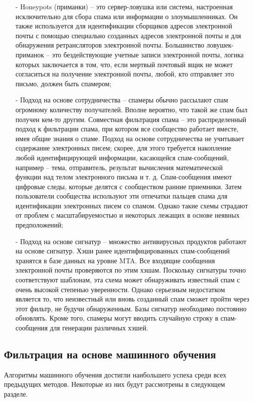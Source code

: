     \begin{itemize}
        \item[-] Honeypots (приманки) -- это сервер-ловушка или система, настроенная исключительно для сбора спама или 
        информации о злоумышленниках. Он также используется для идентификации сборщиков адресов электронной 
        почты с помощью специально созданных адресов электронной почты и для обнаружения ретрансляторов 
        электронной почты. Большинство ловушек-приманок -- это бездействующие учетные записи электронной почты, 
        логика которых заключается в том, что, если мертвый почтовый ящик не может согласиться на получение 
        электронной почты, любой, кто отправляет это письмо, должен быть спамером;
        \item[-] Подход на основе сотрудничества -- спамеры обычно рассылают спам огромному количеству получателей. Вполне вероятно, что такой же спам 
        был получен кем-то другим. Совместная фильтрация спама -- это распределенный подход к фильтрации спама, 
        при котором все сообщество работает вместе, имея общие знания о спаме. Подход на основе сотрудничества 
        не учитывает содержание электронных писем; скорее, для этого требуется накопление любой идентифицирующей 
        информации, касающейся спам-сообщений, например -- тема, отправитель, результат вычисления математической 
        функции над телом электронного письма и т. д. Спам-сообщения имеют цифровые следы, которые делятся с 
        сообществом ранние приемники. Затем пользователи сообщества используют эти отпечатки пальцев спама для 
        идентификации электронных писем со спамом. Однако такие схемы страдают от проблем с 
        масштабируемостью и некоторых лежащих в основе неявных предположений;
        \item[-] Подход на основе сигнатур -- множество антивирусных продуктов работают на основе сигнатур. Хэши ранее 
        идентифицированных спам-сообщений хранятся в базе данных на уровне MTA. Все входящие сообщения 
        электронной почты проверяются по этим хэшам. Поскольку сигнатуры точно соответствуют шаблонам, 
        эта схема может обнаруживать известный спам с очень высокой степенью уверенности. 
        Однако серьезным недостатком является то, что неизвестный или вновь созданный спам сможет 
        пройти через этот фильтр, не будучи обнаруженным. Базы сигнатур необходимо постоянно обновлять. 
        Кроме того, спамеры могут вводить случайную строку в спам-сообщения для генерации различных хэшей.
    \end{itemize}

\subsection{Фильтрация на основе машинного обучения}
    Алгоритмы машинного обучения достигли наибольшего успеха среди 
    всех предыдущих методов. Некоторые из них будут рассмотрены в следующем разделе.
